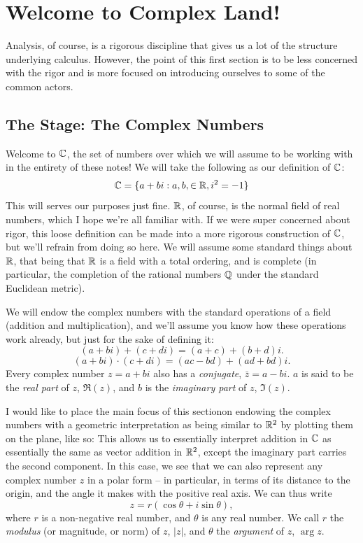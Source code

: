 \section{Welcome to Complex Land!}
Analysis, of course, is a rigorous discipline that gives us a lot of the structure underlying calculus. However, the point of this first section is to be less concerned with the rigor and is more focused on introducing ourselves to some of the common actors.

\subsection{The Stage: The Complex Numbers}
Welcome to $\mathbb C$, the set of numbers over which we will assume to be working with in the entirety of these notes! We will take the following as our definition of $\mathbb C$:
\[
    \mathbb C = \{ a + b i : a, b, \in \mathbb R, i^2 = -1\}
\]
This will serves our purposes just fine. $\mathbb R$, of course, is the normal field of real numbers, which I hope we're all familiar with. If we were super concerned about rigor, this loose definition can be made into a more rigorous construction of $\mathbb C$, but we'll refrain from doing so here. We will assume some standard things about $\mathbb R$, that being that $\mathbb R$ is a field with a total ordering, and is complete (in particular, the completion of the rational numbers $\mathbb Q$ under the standard Euclidean metric).

We will endow the complex numbers with the standard operations of a field (addition and multiplication), and we'll assume you know how these operations work already, but just for the sake of defining it:
\[(a + bi) + (c + di) = (a + c) + (b+ d) i.\]
\[(a + bi) \cdot (c + di) = (ac - bd) + (ad + bd)i. \]
Every complex number $z = a + bi$ also has a \textit{conjugate}, $\bar z = a - bi$. $a$ is said to be the \textit{real part} of $z$, $\Re(z)$, and $b$ is the \textit{imaginary part} of $z$, $\Im(z)$.

I would like to place the main focus of this sectionon endowing the complex numbers with a geometric interpretation as being similar to $\mathbb R^2$ by plotting them on the plane, like so:
This allows us to essentially interpret addition in $\mathbb C$ as essentially the same as vector addition in $\mathbb R^2$, except the imaginary part carries the second component. In this case, we see that we can also represent any complex number $z$ in a polar form -- in particular, in terms of its distance to the origin, and the angle it makes with the positive real axis. We can thus write
\[
    z = r (\cos \theta + i \sin \theta),
\]
where $r$ is a non-negative real number, and $\theta$ is any real number. We call $r$ the \textit{modulus} (or magnitude, or norm) of $z$, $|z|$, and $\theta$ the \textit{argument} of $z$, $\arg z$.

